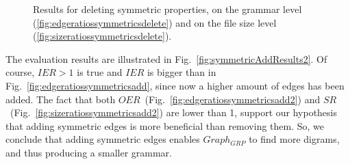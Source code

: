 \begin{figure}[h]
	\centering
	\hfill 
	\caption{Results for deleting symmetric properties, on the grammar level (\ref{fig:edgeratiossymmetricsdelete}) and on the file size level (\ref{fig:sizeratiossymmetricsdelete}).}
	\label{fig:symmetricDeleteResults}
\end{figure}

The evaluation results are illustrated in Fig.~\ref{fig:symmetricAddResults2}. Of course, $IER>1$ is true and $IER$ is bigger than in Fig.~\ref{fig:edgeratiossymmetricsadd}, since now a higher amount of edges has been added. The fact that both $OER$~(Fig.~\ref{fig:edgeratiossymmetricsadd2}) and $SR$~(Fig.~\ref{fig:sizeratiossymmetricsadd2}) are lower than 1, support our hypothesis that adding symmetric edges is more beneficial than removing them. So, we conclude that adding symmetric edges enables $Graph_{GRP}$ to find more digrams, and thus producing a smaller grammar.

